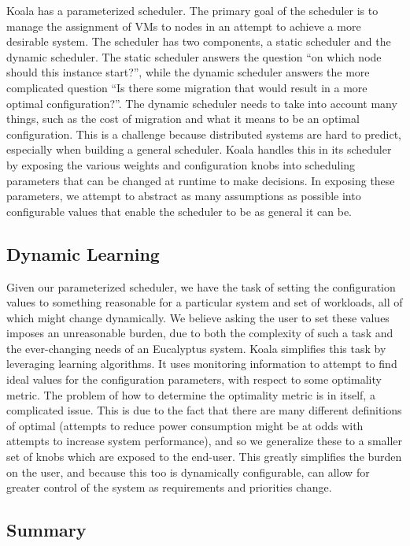 Koala has a parameterized scheduler.  The primary goal of the scheduler is to
manage the assignment of VMs to nodes in an attempt to achieve a more desirable
system.  The scheduler has two components, a static scheduler and the dynamic
scheduler.  The static scheduler answers the question ``on which node should
this instance start?'', while the dynamic scheduler answers the more
complicated question ``Is there some migration that would result in a more
optimal configuration?''.  The dynamic scheduler needs to take into account
many things, such as the cost of migration and what it means to be an optimal
configuration.  This is a challenge because distributed systems are hard to
predict, especially when building a general scheduler.  Koala handles this in
its scheduler by exposing the various weights and configuration knobs into
scheduling parameters that can be changed at runtime to make decisions.  In
exposing these parameters, we attempt to abstract as many assumptions as
possible into configurable values that enable the scheduler to be as general it
can be.

\subsection{Dynamic Learning}
Given our parameterized scheduler, we have the task of setting the
configuration values to something reasonable for a particular system and set of
workloads, all of which might change dynamically.  We believe asking the user
to set these values imposes an unreasonable burden, due to both the complexity
of such a task and the ever-changing needs of an Eucalyptus system.  Koala
simplifies this task by leveraging learning algorithms.  It uses monitoring
information to attempt to find ideal values for the configuration parameters,
with respect to some optimality metric.  The problem of how to determine the
optimality metric is in itself, a complicated issue.  This is due to the fact
that there are many different definitions of optimal (attempts to reduce power
consumption might be at odds with attempts to increase system performance), and
so we generalize these to a smaller set of knobs which are exposed to the
end-user.  This greatly simplifies the burden on the user, and because this too
is dynamically configurable, can allow for greater control of the system as
requirements and priorities change.

\subsection{Summary}


